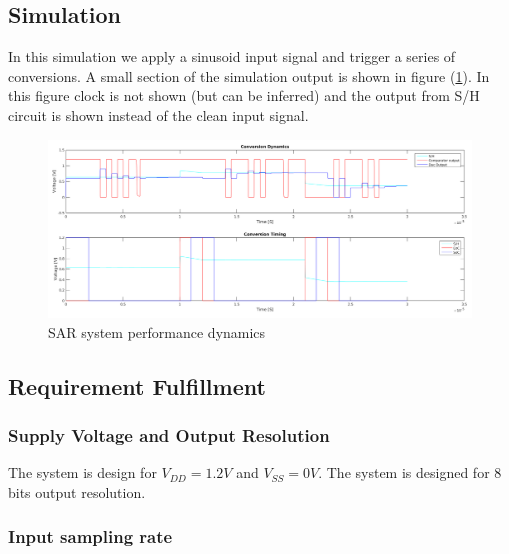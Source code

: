 \documentclass[english, 12pt, a4paper]{ifimaster}
\begin{document}
% 


\subsection{Simulation}
In this simulation we apply a sinusoid input signal and trigger a series of conversions. A small section of the simulation output is shown in figure (\ref{fig:system:dynamics}). 
In this figure clock is not shown (but can be inferred) and the output from S/H circuit is shown instead of the clean input signal.
 
 \begin{figure}[!ht]
  \centering
  \includegraphics[width=\textwidth]{img/system/sar_system_dynamics}
  \caption{SAR system performance dynamics}
  \label{fig:system:dynamics}
 \end{figure}
 
\subsection{Requirement Fulfillment}

\subsubsection{Supply Voltage and Output Resolution}
The system is design for \(V_{DD} = 1.2V\) and \(V_{SS} = 0V \). The system is designed for 8 bits output resolution.

\subsubsection{Input sampling rate}
\end{document}
